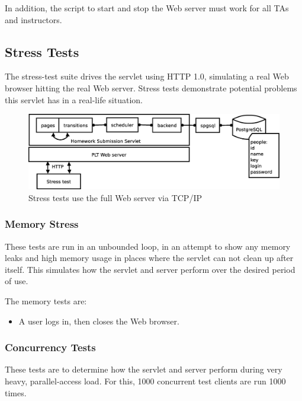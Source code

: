 \documentclass[a4paper]{article}
\begin{document}
In addition, the script to start and stop the Web server must work for all TAs
and instructors.

\subsection{Stress Tests}\label{subsec:stresstests}

The stress-test suite drives the servlet using HTTP 1.0, simulating a real Web
browser hitting the real Web server. Stress tests demonstrate potential
problems this servlet has in a real-life situation.

\begin{figure}[ht]
\centering
\includegraphics[scale=.30]{stress-test.eps}
\caption{Stress tests use the full Web server via TCP/IP}
\label{fig:stress-tests}
\end{figure}

\subsubsection{Memory Stress}\label{subsubsec:mem-stress}

These tests are run in an unbounded loop, in an attempt to show any memory
leaks and high memory usage in places where the servlet can not clean up after
itself. This simulates how the servlet and server perform over the desired
period of use.

The memory tests are:

\begin{itemize}
\item{A user logs in, then closes the Web browser.}
\end{itemize}

\subsubsection{Concurrency Tests}\label{subsubsec:parrallel-stress}

These tests are to determine how the servlet and server perform during very
heavy, parallel-access load. For this, 1000 concurrent test clients are run
1000 times.
\end{document}
